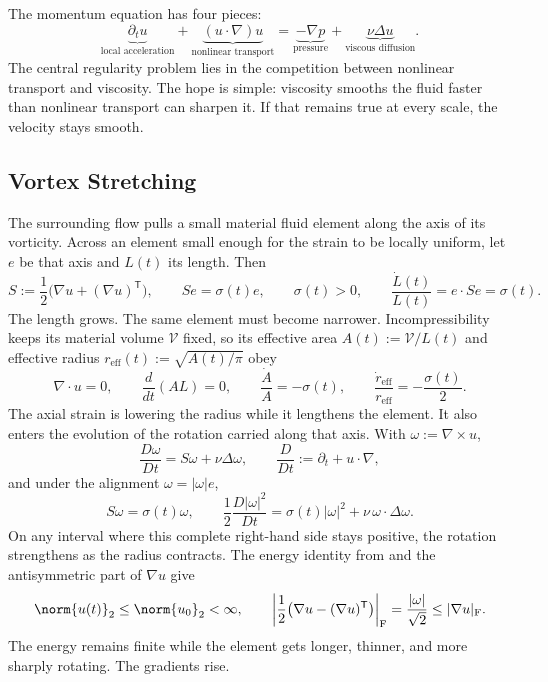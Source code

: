 
The momentum equation has four pieces:
\[
  \underbrace{\partial_t u}_{\text{local acceleration}}
  +
  \underbrace{(u\cdot\nabla)u}_{\text{nonlinear transport}}
  =
  \underbrace{-\nabla p}_{\text{pressure}}
  +
  \underbrace{\nu\Delta u}_{\text{viscous diffusion}}.
\]
The central regularity problem lies in the competition between nonlinear transport and viscosity.
The hope is simple: viscosity smooths the fluid faster than nonlinear transport can sharpen it.
If that remains true at every scale, the velocity stays smooth.

\subsection{Vortex Stretching}\label{sub:ThePerfectlyStretchingVortex}

The surrounding flow pulls a small material fluid element along the axis of its vorticity.
Across an element small enough for the strain to be locally uniform, let \(e\) be that axis and \(L(t)\) its length.
Then
\[
  S:=\frac12\bigl(\nabla u+(\nabla u)^{\mathsf T}\bigr),
  \qquad
  Se=\sigma(t)e,
  \qquad
  \sigma(t)>0,
  \qquad
  \frac{\dot L(t)}{L(t)}
  =
  e\cdot Se
  =
  \sigma(t).
\]
The length grows.
The same element must become narrower.
Incompressibility keeps its material volume \(\mathcal V\) fixed, so its effective area \(A(t):=\mathcal V/L(t)\) and effective radius \(r_{\mathrm{eff}}(t):=\sqrt{A(t)/\pi}\) obey
\[
  \nabla\cdot u=0,
  \qquad
  \frac{d}{dt}(A L)=0,
  \qquad
  \frac{\dot A}{A}=-\sigma(t),
  \qquad
  \frac{\dot r_{\mathrm{eff}}}{r_{\mathrm{eff}}}
  =
  -\frac{\sigma(t)}{2}.
\]
The axial strain is lowering the radius while it lengthens the element.
It also enters the evolution of the rotation carried along that axis.
With \(\omega:=\nabla\times u\),
\[
  \frac{D\omega}{Dt}
  =
  S\omega+\nu\Delta\omega,
  \qquad
  \frac{D}{Dt}
  :=
  \partial_t+u\cdot\nabla,
\]
and under the alignment \(\omega=|\omega|e\),
\[
  S\omega
  =
  \sigma(t)\omega,
  \qquad
  \frac12\frac{D|\omega|^2}{Dt}
  =
  \sigma(t)|\omega|^2
  +
  \nu\,\omega\cdot\Delta\omega.
\]
On any interval where this complete right-hand side stays positive, the rotation strengthens as the radius contracts.
The energy identity from  and the antisymmetric part of \(\nabla u\) give
\[
  \norm{u(t)}_2
  \leq
  \norm{u_0}_2
  <
  \infty,
  \qquad
  \left|\frac12\bigl(\nabla u-(\nabla u)^{\mathsf T}\bigr)\right|_{\mathrm F}
  =
  \frac{|\omega|}{\sqrt2}
  \leq
  |\nabla u|_{\mathrm F}.
\]
The energy remains finite while the element gets longer, thinner, and more sharply rotating.
The gradients rise.

